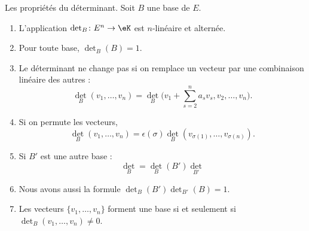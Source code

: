 \begin{lemma}     \label{LemJMWCooELZuho}
    Les propriétés du déterminant. Soit \( B\) une base de \( E\).
    \begin{enumerate}
        \item
            L'application \( \det_B\colon E^n\to \eK\) est \( n\)-linéaire et alternée.
        \item
            Pour toute base, \( \det_B(B)=1\).
        \item
            Le déterminant ne change pas si on remplace un vecteur par une combinaison linéaire des autres :
            \begin{equation}
                \det_B(v_1,\ldots, v_n)=\det_B\big( v_1+\sum_{s=2}^na_sv_s,v_2,\ldots, v_n \big).
            \end{equation}
        \item
            Si on permute les vecteurs,
            \begin{equation}
                \det_B(v_1,\ldots, v_n)=\epsilon(\sigma)\det_B(v_{\sigma(1)},\ldots, v_{\sigma(n)}).
            \end{equation}
        \item
            Si \( B'\) est une autre base :
            \begin{equation}        \label{EqAWICooBLTTOY}
                \det_B=\det_B(B')\det_{B'}
            \end{equation}
        \item
            Nous avons aussi la formule \( \det_{B}(B')\det_{B'}(B)=1\).
        \item\label{ItemDWFLooDUePAf}
            Les vecteurs \( \{ v_1,\ldots, v_n \}\) forment une base si et seulement si \( \det_B(v_1,\ldots, v_n)\neq 0\).
    \end{enumerate}
\end{lemma}

